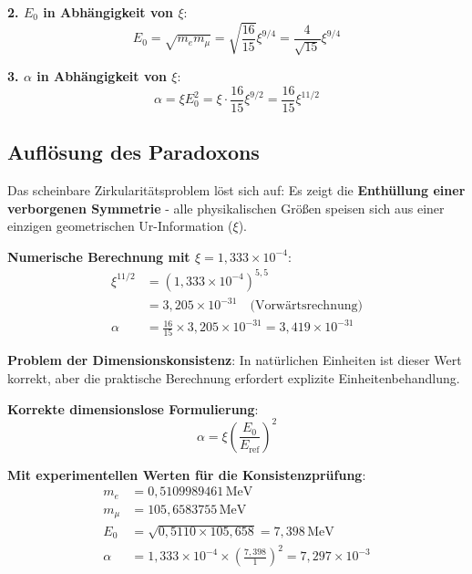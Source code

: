 \documentclass[12pt,a4paper]{article}
\newcommand{\xipar}{\xi}
\newcommand{\alphagem}{\alpha}
\newcommand{\Ezero}{E_0}
\begin{document}
	\textbf{2. $\Ezero$ in Abhängigkeit von $\xipar$}:
	\begin{equation}
		\Ezero = \sqrt{m_e m_\mu} = \sqrt{\frac{16}{15}} \xipar^{9/4} = \frac{4}{\sqrt{15}} \xipar^{9/4}
	\end{equation}
	
	\textbf{3. $\alphagem$ in Abhängigkeit von $\xipar$}:
	\begin{equation}
		\alphagem = \xipar \Ezero^2 = \xipar \cdot \frac{16}{15} \xipar^{9/2} = \frac{16}{15} \xipar^{11/2}
	\end{equation}
	
	\subsection{Auflösung des Paradoxons}
	
	Das scheinbare Zirkularitätsproblem löst sich auf: Es zeigt die \textbf{Enthüllung einer verborgenen Symmetrie} - alle physikalischen Größen speisen sich aus einer einzigen geometrischen Ur-Information ($\xipar$).
	
	\textbf{Numerische Berechnung mit $\xipar = 1{,}333 \times 10^{-4}$}:
	\begin{align}
		\xipar^{11/2} &= (1{,}333 \times 10^{-4})^{5{,}5} \\
		&= 3{,}205 \times 10^{-31} \quad \text{(Vorwärtsrechnung)} \\
		\alphagem &= \frac{16}{15} \times 3{,}205 \times 10^{-31} = 3{,}419 \times 10^{-31}
	\end{align}
	
	\textbf{Problem der Dimensionskonsistenz}: In natürlichen Einheiten ist dieser Wert korrekt, aber die praktische Berechnung erfordert explizite Einheitenbehandlung.
	
	\textbf{Korrekte dimensionslose Formulierung}:
	\begin{equation}
		\alphagem = \xipar \left(\frac{\Ezero}{E_{\text{ref}}}\right)^2
	\end{equation}
	
	\textbf{Mit experimentellen Werten für die Konsistenzprüfung}:
	\begin{align}
		m_e &= 0{,}5109989461\,\text{MeV} \\
		m_\mu &= 105{,}6583755\,\text{MeV} \\
		\Ezero &= \sqrt{0{,}5110 \times 105{,}658} = 7{,}398\,\text{MeV} \\
		\alphagem &= 1{,}333 \times 10^{-4} \times \left(\frac{7{,}398}{1}\right)^2 = 7{,}297 \times 10^{-3}
	\end{align}
	
\end{document}
